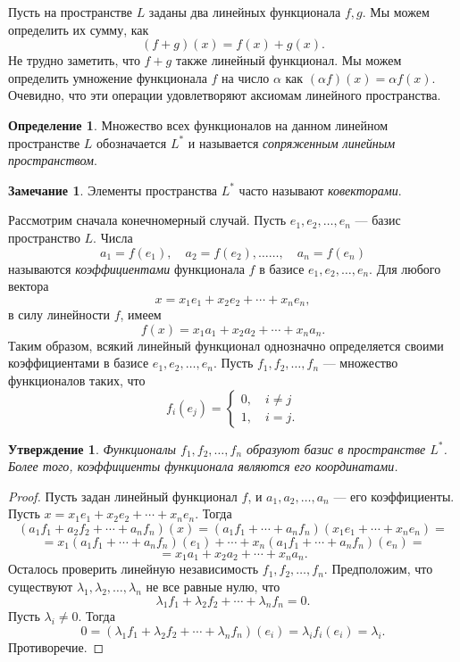 \documentclass[12pt, titlepage, oneside]{amsbook}
\newtheorem{claim}[theorem]{Утверждение}
\theoremstyle{definition}
\newtheorem{definition}[theorem]{Определение}
\newtheorem{remark}[theorem]{Замечание}
\theoremstyle{remark}
\begin{document}
Пусть на пространстве $L$ заданы два линейных функционала $f,g$. Мы можем определить их сумму, как $$(f+g)(x)=f(x)+g(x).$$ Не трудно заметить, что $f+g$ также линейный функционал. Мы можем определить умножение функционала $f$ на число $\alpha$ как $(\alpha f)(x)=\alpha f(x)$. Очевидно, что эти операции удовлетворяют аксиомам линейного пространства.

\begin{definition}
Множество всех функционалов на данном линейном пространстве $L$ обозначается $L^*$ и называется \emph{сопряженным линейным пространством}.
\end{definition}

\begin{remark}
Элементы пространства $L^*$ часто называют \emph{ковекторами}.
\end{remark}

Рассмотрим сначала конечномерный случай. Пусть $e_1,e_2,\ldots, e_n$ --- базис пространство $L$. Числа $$a_1=f(e_1),\quad a_2=f(e_2),\ldots\ldots,\quad a_n=f(e_n)$$ называются \emph{коэффициентами} функционала $f$ в базисе $e_1,e_2,\ldots, e_n$. Для любого вектора $$x=x_1 e_1+ x_2 e_2+\cdots+x_n e_n,$$ в силу линейности $f$, имеем $$f(x)=x_1 a_1+ x_2 a_2+\cdots+x_n a_n.$$ Таким образом, всякий линейный функционал однозначно определяется своими коэффициентами в базисе $e_1,e_2,\ldots, e_n$. Пусть $f_1,f_2,\ldots, f_n$ --- множество функционалов таких, что $$f_i(e_j)=\begin{cases}0,\quad i\neq j\\
1,\quad i=j.\end{cases}$$

 \begin{claim}
\label{LP2}
Функционалы $f_1,f_2,\ldots, f_n$ образуют базис в пространстве $L^*$. Более того, коэффициенты функционала являются его координатами.
\end{claim}

\begin{proof}
Пусть задан линейный функционал $f$, и $a_1,a_2,\ldots, a_n$ --- его коэффициенты. Пусть $x=x_1 e_1+ x_2 e_2+\cdots+x_n e_n$. Тогда $$(a_1 f_1+ a_2 f_2+\cdots+ a_n f_n)(x)=(a_1 f_1+\cdots+ a_n f_n)(x_1 e_1+ \cdots+x_n e_n)=$$ $$=x_1(a_1 f_1+\cdots+ a_n f_n)(e_1)+\cdots+x_n(a_1 f_1+\cdots+ a_n f_n)(e_n)=$$ $$=x_1 a_1+ x_2 a_2+\cdots+x_n a_n.$$ Осталось проверить линейную независимость $f_1,f_2,\ldots, f_n$. Предположим, что существуют $\lambda_1,\lambda_2,\ldots, \lambda_n$ не все равные нулю, что $$\lambda_1f_1+\lambda_2f_2+\cdots+\lambda_n f_n=0.$$ Пусть $\lambda_i\neq 0$. Тогда $$0=(\lambda_1f_1+\lambda_2f_2+\cdots+\lambda_n f_n)(e_i)=\lambda_if_i(e_i)=\lambda_i.$$ Противоречие.
\end{proof}
\end{document}
